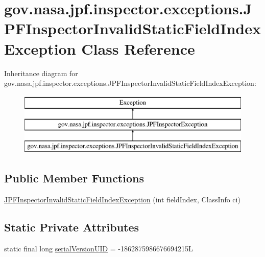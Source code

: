 \hypertarget{classgov_1_1nasa_1_1jpf_1_1inspector_1_1exceptions_1_1_j_p_f_inspector_invalid_static_field_index_exception}{}\section{gov.\+nasa.\+jpf.\+inspector.\+exceptions.\+J\+P\+F\+Inspector\+Invalid\+Static\+Field\+Index\+Exception Class Reference}
\label{classgov_1_1nasa_1_1jpf_1_1inspector_1_1exceptions_1_1_j_p_f_inspector_invalid_static_field_index_exception}
Inheritance diagram for gov.\+nasa.\+jpf.\+inspector.\+exceptions.\+J\+P\+F\+Inspector\+Invalid\+Static\+Field\+Index\+Exception\+:\begin{figure}[H]
\begin{center}
\leavevmode
\includegraphics[height=3.000000cm]{classgov_1_1nasa_1_1jpf_1_1inspector_1_1exceptions_1_1_j_p_f_inspector_invalid_static_field_index_exception}
\end{center}
\end{figure}
\subsection*{Public Member Functions}
\begin{DoxyCompactItemize}
\item 
\hyperlink{classgov_1_1nasa_1_1jpf_1_1inspector_1_1exceptions_1_1_j_p_f_inspector_invalid_static_field_index_exception_a9e0ee120b6e58fa8a68bf1eb60779c69}{J\+P\+F\+Inspector\+Invalid\+Static\+Field\+Index\+Exception} (int field\+Index, Class\+Info ci)
\end{DoxyCompactItemize}
\subsection*{Static Private Attributes}
\begin{DoxyCompactItemize}
\item 
static final long \hyperlink{classgov_1_1nasa_1_1jpf_1_1inspector_1_1exceptions_1_1_j_p_f_inspector_invalid_static_field_index_exception_a09c64ee5ad3db2e6852f636528bbc034}{serial\+Version\+U\+ID} = -\/1862875986676694215L
\end{DoxyCompactItemize}


